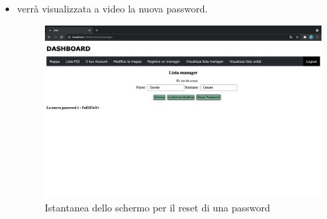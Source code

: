 \begin{itemize}
\begin{itemize}
\begin{figure}[H]
            \end{figure}
            \item verrà visualizzata a video la nuova password.
            \begin{figure}[H]
                \centering
                \includegraphics[scale=0.12]{res/images/resetpassowrd2.png}
                \caption{Istantanea dello schermo per il reset di una password}
            \end{figure}
        \end{itemize}
\end{itemize}


